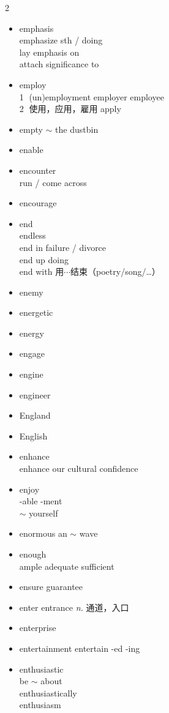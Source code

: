 \documentclass[../../book.tex]{subfiles}
\begin{document}
\begin{multicols}{2}
\begin{itemize}
\item[-] emphasis
\\emphasize sth / doing
\\lay emphasis on
\\attach significance to
\item[-] employ
\\\textcircled{1} {\small (un)employment employer employee}
\\\textcircled{2} 使用，应用，雇用 apply
\item[-] empty \phantom{a} $\sim$ the dustbin
\item[-] enable
\item[-] encounter
\\run / come across
\item[-] encourage
\item[-] end
\\endless
\\end in failure / divorce
\\end up doing
\\end with 用$\cdots$结束（poetry/song/\ldots）
\item[-] enemy
\item[-] energetic
\item[-] energy
\item[-] engage
\item[-] engine
\item[-] engineer
\item[-] England
\item[-] English
\item[-] enhance
\\enhance our cultural confidence
\item[-] enjoy
\\-able -ment
\\$\sim$ yourself
\item[-] enormous \phantom{a} an $\sim$ wave
\item[-] enough
\\ample adequate sufficient
\item[-] ensure \phantom{a} guarantee
\item[-] enter \phantom{a} entrance \emph{n.} 通道，入口
\item[-] enterprise
\item[-] entertainment \phantom{a} entertain -ed -ing
\item[-] enthusiastic
\\be $\sim$ about
\\enthusiastically
\\enthusiasm

\end{itemize}
\end{multicols}
\end{document}
